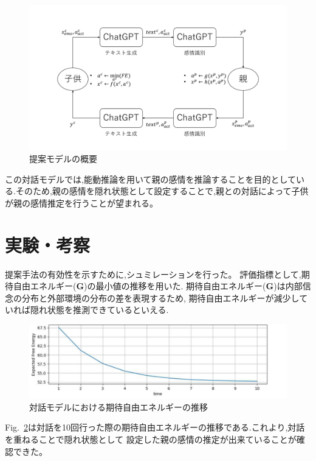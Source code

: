 \documentclass[a4j,10pt,uplatex]{jsarticle}
\begin{document}
\begin{figure}[h]
 \centering
 \includegraphics[width=1.\linewidth,pagebox=artbox]{./fig/system.pdf}
 \caption{提案モデルの概要} 
 \label{system}
\end{figure}

この対話モデルでは,能動推論を用いて親の感情を推論することを目的としている.そのため,親の感情を隠れ状態として設定することで,親との対話によって子供が親の感情推定を行うことが望まれる。

\section{実験・考察}
提案手法の有効性を示すために,シュミレーションを行った。
評価指標として,期待自由エネルギー($\mathbf{G}$)の最小値の推移を用いた.
期待自由エネルギー($\mathbf{G}$)は内部信念の分布と外部環境の分布の差を表現するため,
期待自由エネルギーが減少していれば隠れ状態を推測できているといえる.

\begin{figure}[h]
 \centering
 \includegraphics[width=1.\linewidth,pagebox=artbox]{./fig/EFE.pdf}
 \caption{対話モデルにおける期待自由エネルギーの推移} 
 \label{EFE}
\end{figure}

Fig.~\ref{EFE}は対話を10回行った際の期待自由エネルギーの推移である.これより,対話を重ねることで隠れ状態として
設定した親の感情の推定が出来ていることが確認できた。
\end{document}
